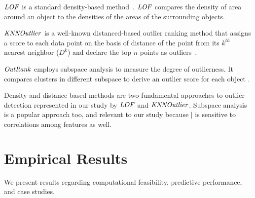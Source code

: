 \documentclass[conference]{IEEEtran}
\begin{document}
						\begin{LaTeXdescription}
							\item[$\it{LOF}$] is a standard density-based method~\cite{Breunig2000}.
							$\it{LOF}$ compares the density of area around an object to the densities of the areas of the surrounding objects. 
							\item[$\it{KNNOutlier}$] is a well-known distanced-based outlier ranking method that assigns a score to each data point on the basis of distance of the point from its $k^{th}$ nearest neighbor ($D^k$) and  declare the top $n$ points as outliers~\cite{Ramaswamy2000}. 
							\item[$\it{OutRank}$] employs subspace analysis to measure the degree of outlierness. It compares clusters in different subspace to derive an outlier score for each object \cite{Muller2012}. \end{LaTeXdescription}
						
						Density and distance based methods are two fundamental approaches to outlier detection represented in our study by $\it{LOF}$ and $\it{KNNOutlier}$. Subspace analysis is a popular approach too, and relevant to our study because $\mid$ is sensitive to correlations among features as well. 
						
						
						\section{Empirical Results}
						
						We present results regarding computational feasibility, 
						predictive performance, and case studies.
						
\end{document}
